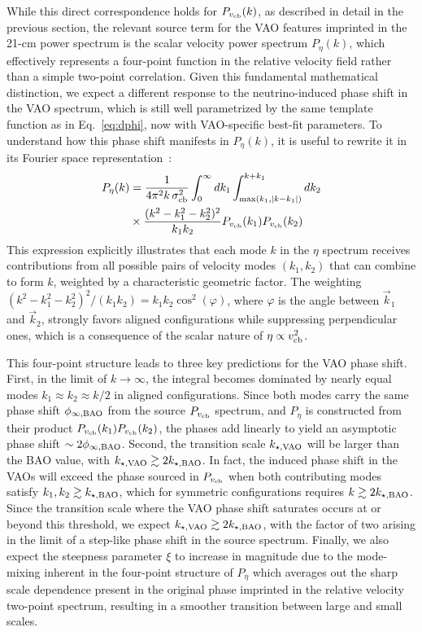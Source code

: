 \documentclass[floats,floatfix,showpacs,amssymb,prd,twocolumn,superscriptaddress,nofootinbib,reprint,preprintnumbers]{revtex4-2}
\begin{document}
While this direct correspondence holds for $P_{v_{\rm cb}}(k)$, as described in detail in the previous section, the relevant source term for the VAO features imprinted in the 21-cm power spectrum is the scalar velocity power spectrum $P_\eta(k)$, which effectively represents a four-point function in the relative velocity field rather than a simple two-point correlation. Given this fundamental mathematical distinction, we expect a different response to the neutrino-induced phase shift in the VAO spectrum, which is still well parametrized by the same template function as in Eq.~\eqref{eq:dphi},  now with VAO-specific best-fit parameters. To understand how this phase shift manifests in $P_\eta(k)$, it is useful to rewrite it in its Fourier space representation~\cite{ferraro12}:
\begin{align}
    P_\eta(k)&=  \frac{1}{4\pi^2k\,\sigma_{\rm cb}^2}\int_0^\infty dk_1 \int_{\max(k_1, |k-k_1|)}^{k+k_1} dk_2  \nonumber \\
    &\times \frac{(k^2 - k_1^2 - k_2^2)^2}{k_1 k_2} P_{v_\mathrm{cb}}(k_1)P_{v_\mathrm{cb}}(k_2)
\end{align}
This expression explicitly illustrates that each mode $k$ in the $\eta$ spectrum receives contributions from all possible pairs of velocity modes $(k_1,k_2)$ that can combine to form $k$,  weighted by a characteristic geometric factor. The weighting $\left(k^2 - k_1^2 -k_2^2\right)^2/\left(k_1 k_2\right) = k_1 k_2\cos^2(\varphi)$, where $\varphi$ is the angle between $\vec{k}_1$
and $\vec{k}_2$, strongly favors aligned configurations while suppressing perpendicular ones, which is a consequence of the scalar nature of $\eta \propto v_{\rm cb}^2$. 

This four-point structure leads to three key predictions for the VAO phase shift. First, in the limit of $k\rightarrow \infty$, the integral becomes dominated by nearly equal modes $k_1 \approx k_2 \approx k/2$ in aligned configurations. Since both modes carry the  same phase shift $\phi_{\infty, \rm BAO}$ from the source $P_{v_{\rm cb}}$ spectrum, and $P_\eta$ is constructed from their product $P_{v_{\rm cb}}(k_1)P_{v_{\rm cb}}(k_2)$, the phases add linearly to yield an asymptotic phase shift $\sim 2\phi_{\infty,\rm BAO}$. 
Second, the transition scale $k_{\star,\rm VAO}$ will be larger than the BAO value, with $k_{\star,\rm VAO} \gtrsim 2k_{\star, \rm BAO}$. In fact, the induced phase shift in the VAOs will exceed the phase sourced in $P_{v_{\rm cb}}$ when both contributing modes satisfy $k_1, k_2 \gtrsim k_{\star, \rm BAO}$, which for symmetric configurations requires $k \gtrsim 2k_{\star, \rm BAO}$. Since the transition scale where the VAO phase shift saturates occurs at or beyond this threshold, we expect $k_{\star,\rm VAO} \gtrsim 2 k_{\star, \rm BAO}$, with the factor of two arising in the limit of a step-like phase shift in the source spectrum. Finally, we also expect the steepness parameter $\xi$ to increase in magnitude due to the mode-mixing inherent in the four-point structure of $P_\eta$ which averages out the sharp scale dependence present in the original phase imprinted in the relative velocity two-point spectrum, resulting in a smoother transition between large and small scales. 
\end{document}
